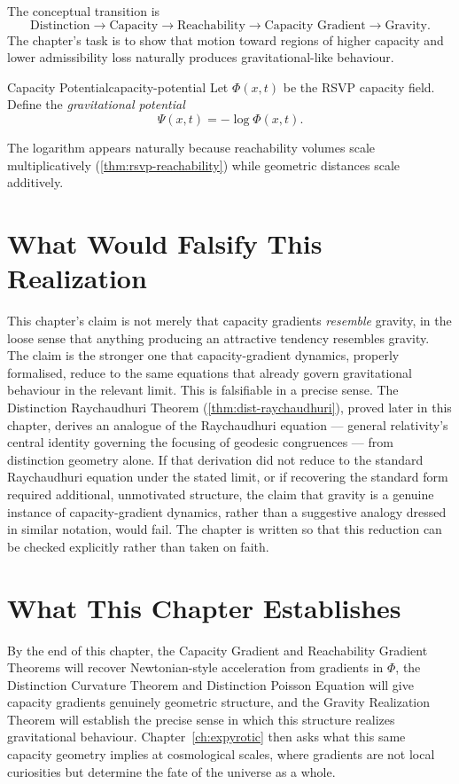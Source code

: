 \documentclass[12pt,twoside,openright]{book}
\begin{document}
The conceptual transition is
\[
  \text{Distinction} \to \text{Capacity} \to \text{Reachability}
  \to \text{Capacity Gradient} \to \text{Gravity}.
\]
The chapter's task is to show that motion toward regions of
higher capacity and lower admissibility loss naturally
produces gravitational-like behaviour.

\begin{definition}{Capacity Potential}{capacity-potential}
  Let $\Phi(x,t)$ be the RSVP capacity field. Define the
  \emph{gravitational potential}
  \[
    \Psi(x,t) = -\log \Phi(x,t).
  \]
\end{definition}

The logarithm appears naturally because reachability
volumes scale multiplicatively (\cref{thm:rsvp-reachability})
while geometric distances scale additively.

\section{What Would Falsify This Realization}
\label{sec:ch17-falsifiability}

This chapter's claim is not merely that capacity gradients
\emph{resemble} gravity, in the loose sense that anything
producing an attractive tendency resembles gravity. The claim
is the stronger one that capacity-gradient dynamics, properly
formalised, reduce to the same equations that already govern
gravitational behaviour in the relevant limit. This is
falsifiable in a precise sense. The Distinction Raychaudhuri
Theorem (\cref{thm:dist-raychaudhuri}), proved later in this
chapter, derives an analogue of the Raychaudhuri equation ---
general relativity's central identity governing the focusing
of geodesic congruences --- from distinction geometry alone.
If that derivation did not reduce to the standard Raychaudhuri
equation under the stated limit, or if recovering the standard
form required additional, unmotivated structure, the claim
that gravity is a genuine instance of capacity-gradient
dynamics, rather than a suggestive analogy dressed in similar
notation, would fail. The chapter is written so that this
reduction can be checked explicitly rather than taken on
faith.

\section{What This Chapter Establishes}
\label{sec:ch17-preview}

By the end of this chapter, the Capacity Gradient and
Reachability Gradient Theorems will recover Newtonian-style
acceleration from gradients in $\Phi$, the Distinction
Curvature Theorem and Distinction Poisson Equation will give
capacity gradients genuinely geometric structure, and the
Gravity Realization Theorem will establish the precise sense
in which this structure realizes gravitational behaviour.
Chapter~\ref{ch:expyrotic} then asks what this same capacity
geometry implies at cosmological scales, where gradients are
not local curiosities but determine the fate of the universe
as a whole.
\end{document}
